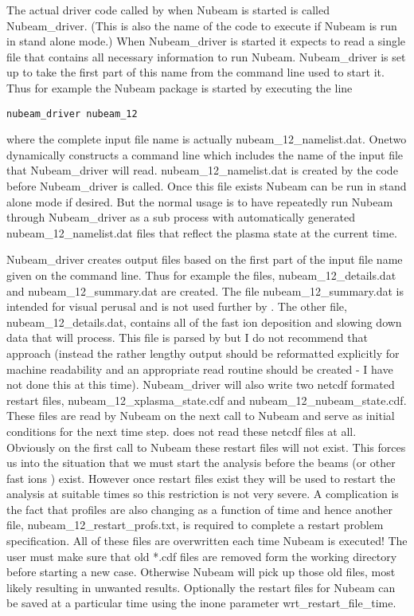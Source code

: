    The actual  driver code  called by  \ot when  Nubeam is started  is
   called Nubeam\_driver. (This is also the name of the code to execute
   if Nubeam is run in stand alone mode.)
   When Nubeam\_driver   is started it expects to read a
   single file that contains all necessary information to run Nubeam.
   Nubeam\_driver is set up to take the first part of this name from
   the  command line used to start it. Thus for example the Nubeam
   package is started by executing the line 
   \begin{center}
   \texttt{nubeam\_driver nubeam\_12}  
   \end{center}
   where the complete input file name is actually
   nubeam\_12\_namelist.dat.
   Onetwo dynamically constructs a command line which includes the
   name of the input file that Nubeam\_driver will read.
   nubeam\_12\_namelist.dat is created  by the \ot code before
   Nubeam\_driver  is called. Once this file exists Nubeam can be
   run  in stand alone mode if desired. But the normal
   usage is to have \ot repeatedly run Nubeam  through Nubeam\_driver
   as  a sub process
   with automatically generated nubeam\_12\_namelist.dat  files that
   reflect the plasma state at the current time. 



   Nubeam\_driver   creates output files based on the first part of the
   input file name given on the  command line. Thus for example
   the files, nubeam\_12\_details.dat and nubeam\_12\_summary.dat
   are created. The file nubeam\_12\_summary.dat is intended for
   visual perusal and is not used  further  by \ot. The other file,
   nubeam\_12\_details.dat, contains all of the  fast ion deposition and
   slowing down data that \ot will process. This file is parsed by \ot
   but I  do not recommend that approach (instead the rather lengthy
   output should be reformatted explicitly for machine readability
   and an appropriate read routine should be created - I have not done
   this at this time). Nubeam\_driver
   will also write two netcdf formated restart
   files, nubeam\_12\_xplasma\_state.cdf and
   nubeam\_12\_nubeam\_state.cdf. These files are read by Nubeam on the
   next call to Nubeam and serve as initial conditions for the next
   time step. \ot does not read these netcdf files at all. Obviously on
   the first call to Nubeam these restart files will not exist. This
   forces us into the situation that we must start the analysis before
   the beams (or other fast ions ) exist. However once restart files exist
   they will be used to restart the analysis at suitable times so this
   restriction is not very severe. A complication is the fact that \ot
   profiles are also changing as a function of time and hence another
   file, nubeam\_12\_restart\_profs.txt, is required to complete a
   restart problem specification. All of these files are overwritten
   each time Nubeam is executed! The user must make sure that old
   *.cdf files are removed form the working directory before starting
   a new case. Otherwise Nubeam will pick up those old files, most
   likely resulting in unwanted results.  Optionally the
    restart files for Nubeam can be saved at a particular time
   using the inone parameter wrt\_restart\_file\_time.
      
